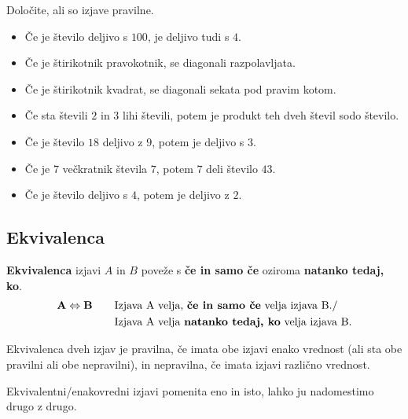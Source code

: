          

         
             \begin{naloga}
                Določite, ali so izjave pravilne.
                \begin{itemize}
                    \item Če je število deljivo s $100$, je deljivo tudi s $4$.
                    \item Če je štirikotnik pravokotnik, se diagonali razpolavljata.
                    \item Če je štirikotnik kvadrat, se diagonali sekata pod pravim kotom.
                    \item Če sta števili $2$ in $3$ lihi števili, potem je produkt teh dveh števil sodo število.
                    \item Če je število $18$ deljivo z $9$, potem je deljivo s $3$.
                    \item Če je $7$ večkratnik števila $7$, potem $7$ deli število $43$.
                    \item Če je število deljivo s $4$, potem je deljivo z $2$.
                \end{itemize}
            \end{naloga}
         
         
             \subsection{Ekvivalenca}
                \textbf{Ekvivalenca} izjavi $A$ in $B$ poveže s \textbf{če in samo če} oziroma
                \textbf{natanko tedaj, ko}.
                \begin{align*} 
                    \mathbf{A\Leftrightarrow B} \quad \quad &\textmd{Izjava A velja, \textbf{če in
                    samo če} velja izjava B.} / \\
                        &\textmd{Izjava A velja \textbf{natanko tedaj, ko} velja izjava B.}
                \end{align*}
             


                      
                        Ekvivalenca dveh izjav je pravilna, če imata obe izjavi enako vrednost 
                        (ali sta obe pravilni ali obe nepravilni), in nepravilna, če imata izjavi
                        različno vrednost.
                     
                      
                        Ekvivalentni/enakovredni izjavi pomenita eno in isto, lahko ju nadomestimo 
                        drugo z drugo.
                     

